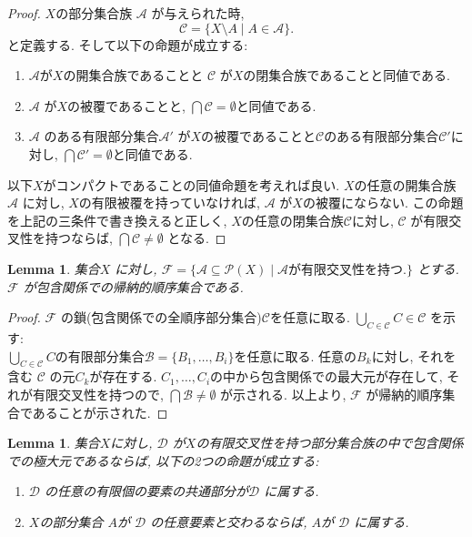 \documentclass[dvipdfmx]{jbook}
\newtheorem{lemma}[theorem]{Lemma}
\theoremstyle{remark}
\theoremstyle{plain}
\begin{document}
\begin{proof}
	$X$の部分集合族 $\mathcal{A}$ が与えられた時, 
	\[
	\mathcal{C} = \{X \setminus A  \mid  A \in \mathcal{A} \} 
	.\] 
	と定義する. そして以下の命題が成立する:
	\begin{enumerate}
		\item $\mathcal{A}$が$X$の開集合族であることと $\mathcal{C}$ が$X$の閉集合族であることと同値である.
		\item $\mathcal{A}$ が$X$の被覆であることと,  $\bigcap \mathcal{C} = \emptyset$と同値である.
		\item $\mathcal{A}$ のある有限部分集合$\mathcal{A}'$ が$X$の被覆であることと$\mathcal{C}$のある有限部分集合$\mathcal{C}'$に対し, $\bigcap \mathcal{C}' = \emptyset$と同値である.
	\end{enumerate}
	以下$X$がコンパクトであることの同値命題を考えれば良い.  $X$の任意の開集合族$\mathcal{A}$ に対し, $X$の有限被覆を持っていなければ,  $\mathcal{A}$ が$X$の被覆にならない.
	この命題を上記の三条件で書き換えると正しく,  $X$の任意の閉集合族$\mathcal{C}$に対し,  $\mathcal{C}$ が有限交叉性を持つならば, $\bigcap \mathcal{C} \neq \emptyset$ となる.
\end{proof}

\begin{lemma}
	集合$X$ に対し, $\mathcal{F }= \{ \mathcal{A} \subseteq \mathcal{P}(X)  \mid  \mathcal{A} \text{が有限交叉性を持つ.}\} $ とする. $\mathcal{F}$ が包含関係での帰納的順序集合である.
\end{lemma}

\begin{proof}
	$\mathcal{F}$ の鎖(包含関係での全順序部分集合)$ \mathcal{C}$を任意に取る. $\bigcup_{C \in \mathcal{C}} C \in \mathcal{C}$ を示す:\\
	$\bigcup_{C \in \mathcal{C}} C$の有限部分集合$\mathcal{B}=\{B_1, \ldots , B_i\} $を任意に取る. 任意の$B_k$に対し, それを含む $\mathcal{C}$ の元$C_k$が存在する.  $C_1, \ldots ,C_i $の中から包含関係での最大元が存在して, それが有限交叉性を持つので, $\bigcap \mathcal{B} \neq \emptyset$ が示される.
以上より, $\mathcal{F}$ が帰納的順序集合であることが示された.
\end{proof}

\begin{lemma}
	集合$X$に対し,  $\mathcal{D}$ が$X$の有限交叉性を持つ部分集合族の中で包含関係での極大元であるならば, 以下の2つの命題が成立する: 
	 \begin{enumerate}
		\item $\mathcal{D}$ の任意の有限個の要素の共通部分が$\mathcal{D}$ に属する.
		\item $X$の部分集合 $A$が $\mathcal{D}$ の任意要素と交わるならば, $A$が $\mathcal{D}$ に属する.
	\end{enumerate}
\end{lemma}
\end{document}
